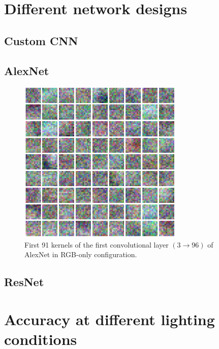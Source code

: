 \documentclass{l4proj}
\begin{document}

\section{Different network designs}

\subsection{Custom CNN}

\subsection{AlexNet}

\begin{figure}[ht]
  \centering
  \includegraphics[width=0.7\textwidth]{images/evaluation/kernels/alexnet_color.png}
  \caption{First 91 kernels of the first convolutional layer $(3 \rightarrow 96)$ of AlexNet in RGB-only configuration.}
  \label{fig:kernels_alexnet}
\end{figure}

\subsection{ResNet}


\section{Accuracy at different lighting conditions}
\end{document}

